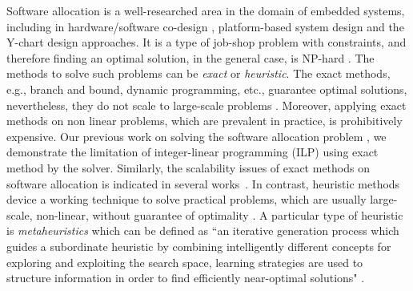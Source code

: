 Software allocation is a well-researched area in the domain of embedded systems, including in hardware/software co-design \cite{Wolf2003ACodesign}, platform-based system design \cite{Sangiovanni-Vincentelli2004BenefitsDesign} and the Y-chart design \cite{ychart_Kienhuis2002} approaches. It is a type of job-shop problem with constraints, and therefore finding an optimal solution, in the general case, is  NP-hard \cite{Fernandez-Baca1989AllocatingSystem}. The methods to solve such problems can be \textit{exact} or \textit{heuristic}. The exact methods, e.g., branch and bound, dynamic programming, etc., guarantee optimal solutions, nevertheless, they do not scale to large-scale problems \cite{Saidi2015AnArchitectures}. Moreover, applying exact methods on non linear problems, which are prevalent in practice, is prohibitively expensive. Our previous work on solving the software allocation problem \cite{Mahmud5222}, we demonstrate the limitation of integer-linear programming (ILP) \cite{Bradley1977AppliedProgramming} using exact method by the \cplex{} solver. Similarly, the scalability issues of exact methods on software allocation is indicated in several works~\cite{Saidi2015AnArchitectures}. In contrast, heuristic methods device a working technique to solve practical problems, which are usually large-scale, non-linear, without guarantee of optimality \cite{faragardi2018AECUs,Bucaioni2018MoVES:Systems}.  A particular type of heuristic is \textit{metaheuristics} which can be defined as ``an iterative generation process which guides a subordinate heuristic by combining intelligently different concepts for exploring and exploiting the search space, learning strategies are used to structure information in order to
find efficiently near-optimal solutions" \cite{Osman2005Metaheuristics:Bibliography}.

